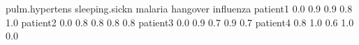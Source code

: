 \begin{Schunk}
% --begin: "comp.circ.unavoid"
\begin{Soutput}
         pulm.hypertens sleeping.sickn malaria hangover influenza
patient1            0.0            0.9     0.9      0.8       1.0
patient2            0.0            0.8     0.8      0.8       0.8
patient3            0.0            0.9     0.7      0.9       0.7
patient4            0.8            1.0     0.6      1.0       0.0
\end{Soutput}
%
% --end: "comp.circ.unavoid"
\end{Schunk}
